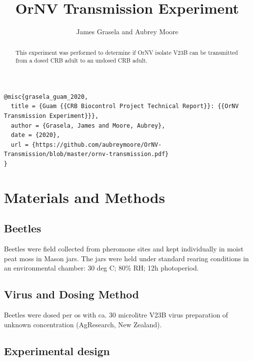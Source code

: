 \documentclass[11pt,letterpaper]{scrartcl}
\begin{document}
\titlehead{\centering Guam Coconut Rhinoceros Beetle Biocontrol Project Technical Report}
\title{OrNV Transmission Experiment}
\author{James Grasela and Aubrey Moore}
\maketitle

\begin{abstract}
	This experiment was performed to determine if OrNV isolate V23B can be transmitted from a dosed CRB adult to an undosed CRB 
	adult.
\end{abstract}

\begin{scriptsize}
\begin{verbatim}
@misc{grasela_guam_2020,
  title = {Guam {{CRB Biocontrol Project Technical Report}}: {{OrNV Transmission Experiment}}},
  author = {Grasela, James and Moore, Aubrey},
  date = {2020},
  url = {https://github.com/aubreymoore/OrNV-Transmission/blob/master/ornv-transmission.pdf}
}
\end{verbatim}
\end{scriptsize}

\newpage

\section{Materials and Methods}

\subsection{Beetles}

Beetles were field collected from pheromone sites and kept individually in moist peat moss in Mason jars. The jars were held under 
standard rearing conditions in an environmental chamber: 30 deg C; 80\% RH; 12h photoperiod.

\subsection{Virus and Dosing Method}

Beetles were dosed per os with ca. 30 microlitre V23B virus preparation of unknown concentration (AgResearch, New Zealand).

\subsection{Experimental design}
\end{document}
